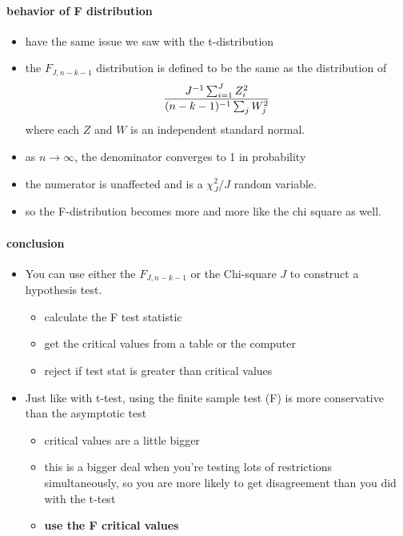 \paragraph{behavior of F distribution}
\label{sec-3-1-2-3-1}

\begin{itemize}
\item have the same issue we saw with the t-distribution
\item the $F_{J, n-k-1}$ distribution is defined to be the same as
          the distribution of
          \[{J^{-1} \sum_{i=1}^J Z_i^2 \over (n-k-1)^{-1} \sum_j
          W_j^2}\] where each $Z$ and $W$ is an independent standard normal.
\item as $n\to \infty$, the denominator converges to 1 in probability
\item the numerator is unaffected and is a $\chi^2_J / J$ random variable.
\item so the F-distribution becomes more and more like the chi
          square as well.
\end{itemize}
\paragraph{conclusion}
\label{sec-3-1-2-3-2}

\begin{itemize}
\item You can use either the $F_{J, n-k-1}$ or the Chi-square $J$ to
          construct a hypothesis test.
\begin{itemize}
\item calculate the F test statistic
\item get the critical values from a table or the computer
\item reject if test stat is greater than critical values
\end{itemize}
\item Just like with t-test, using the finite sample test (F) is
          more conservative than the asymptotic test
\begin{itemize}
\item critical values are a little bigger
\item this is a bigger deal when you're testing lots of
            restrictions simultaneously, so you are more likely to get
            disagreement than you did with the t-test
\item \textbf{use the F critical values}
\end{itemize}
\end{itemize}
